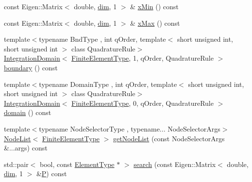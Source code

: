 \begin{DoxyCompactItemize}
\item 
const Eigen\+::\+Matrix$<$ double, \hyperlink{classmodel_1_1_finite_element_a818c65bf8f508c121f1990d430c2b0c0}{dim}, 1 $>$ \& \hyperlink{classmodel_1_1_finite_element_a166e3c2c93b87ad195f4bc4abad122d4}{x\+Min} () const 
\item 
const Eigen\+::\+Matrix$<$ double, \hyperlink{classmodel_1_1_finite_element_a818c65bf8f508c121f1990d430c2b0c0}{dim}, 1 $>$ \& \hyperlink{classmodel_1_1_finite_element_a717c34b8fe491222e46521d14962d5f1}{x\+Max} () const 
\item 
{\footnotesize template$<$typename Bnd\+Type , int q\+Order, template$<$ short unsigned int, short unsigned int $>$ class Quadrature\+Rule$>$ }\\\hyperlink{structmodel_1_1_integration_domain}{Integration\+Domain}$<$ \hyperlink{classmodel_1_1_finite_element_a52dc23d4d24a1a38ff0f90d5708c02a8}{Finite\+Element\+Type}, 1, q\+Order, Quadrature\+Rule $>$ \hyperlink{classmodel_1_1_finite_element_a9e972724763758f9be7714104c16c007}{boundary} () const 
\item 
{\footnotesize template$<$typename Domain\+Type , int q\+Order, template$<$ short unsigned int, short unsigned int $>$ class Quadrature\+Rule$>$ }\\\hyperlink{structmodel_1_1_integration_domain}{Integration\+Domain}$<$ \hyperlink{classmodel_1_1_finite_element_a52dc23d4d24a1a38ff0f90d5708c02a8}{Finite\+Element\+Type}, 0, q\+Order, Quadrature\+Rule $>$ \hyperlink{classmodel_1_1_finite_element_a2f285b7ff103377e29315edef17f2e14}{domain} () const 
\item 
{\footnotesize template$<$typename Node\+Selector\+Type , typename... Node\+Selector\+Args$>$ }\\\hyperlink{structmodel_1_1_node_list}{Node\+List}$<$ \hyperlink{classmodel_1_1_finite_element_a52dc23d4d24a1a38ff0f90d5708c02a8}{Finite\+Element\+Type} $>$ \hyperlink{classmodel_1_1_finite_element_a813c9f0d721104f7caf2ca58e4af3897}{get\+Node\+List} (const Node\+Selector\+Args \&...args) const 
\item 
std\+::pair$<$ bool, const \hyperlink{classmodel_1_1_finite_element_ac75db3a0b957c14015dfa8f17ce5b4ac}{Element\+Type} $\ast$ $>$ \hyperlink{classmodel_1_1_finite_element_a8ccee54764118df6a2a0d89e4615164d}{search} (const Eigen\+::\+Matrix$<$ double, \hyperlink{classmodel_1_1_finite_element_a818c65bf8f508c121f1990d430c2b0c0}{dim}, 1 $>$ \&\hyperlink{_f_e_m_2linear__elasticity__3d_2tetgen_2generate_p_o_l_ycube_8m_a50a9afb44201a65ab7ad5feb2150aeb6}{P}) const 
\item 

\end{DoxyCompactItemize}
